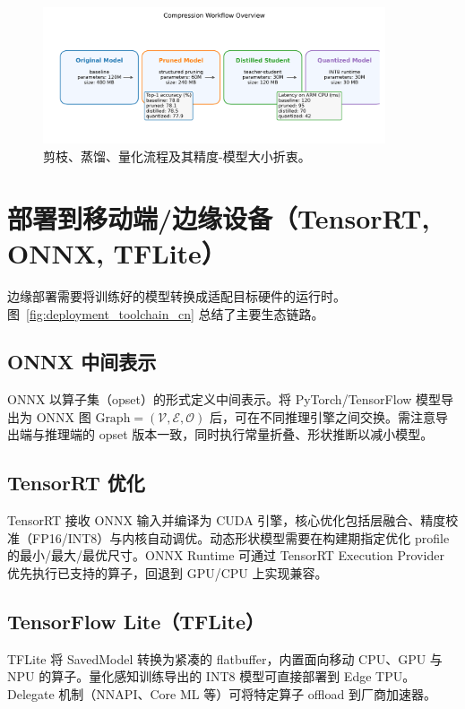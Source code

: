 \documentclass[UTF8,zihao=-4]{ctexart}
\begin{document}
\begin{figure}[H]
  \centering
  \includegraphics[width=0.9\textwidth]{compression_overview.png}
  \caption{剪枝、蒸馏、量化流程及其精度-模型大小折衷。}
  \label{fig:compression_overview_cn}
\end{figure}
\FloatBarrier

\section{部署到移动端/边缘设备（TensorRT, ONNX, TFLite）}
边缘部署需要将训练好的模型转换成适配目标硬件的运行时。图~\ref{fig:deployment_toolchain_cn} 总结了主要生态链路。

\subsection{ONNX 中间表示}
ONNX 以算子集（opset）的形式定义中间表示。将 PyTorch/TensorFlow 模型导出为 ONNX 图 $\text{Graph} = (\mathcal{V}, \mathcal{E}, \mathcal{O})$ 后，可在不同推理引擎之间交换。需注意导出端与推理端的 opset 版本一致，同时执行常量折叠、形状推断以减小模型。

\subsection{TensorRT 优化}
TensorRT 接收 ONNX 输入并编译为 CUDA 引擎，核心优化包括层融合、精度校准（FP16/INT8）与内核自动调优。动态形状模型需要在构建期指定优化 profile 的最小/最大/最优尺寸。ONNX Runtime 可通过 TensorRT Execution Provider 优先执行已支持的算子，回退到 GPU/CPU 上实现兼容。

\subsection{TensorFlow Lite（TFLite）}
TFLite 将 SavedModel 转换为紧凑的 flatbuffer，内置面向移动 CPU、GPU 与 NPU 的算子。量化感知训练导出的 INT8 模型可直接部署到 Edge TPU。Delegate 机制（NNAPI、Core ML 等）可将特定算子 offload 到厂商加速器。
\end{document}
